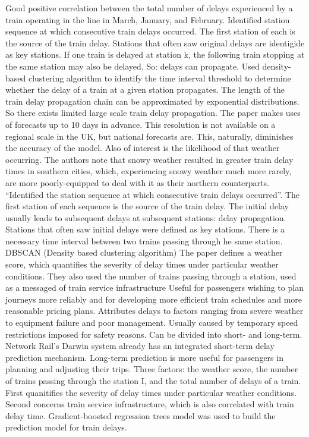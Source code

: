 \documentclass{article}
\begin{document}
Good positive correlation between the total number of delays experienced by a train operating in the line in March, January, and February. 
Identified station sequence at which consecutive train delays occurred. The first station of each is the source of the train delay. Stations that often saw original delays are identigide as key stations. 
If one train is delayed at station k, the following train stopping at the same station may also be delayed. So: delays can propagate. Used density-based clustering algorithm to identify the time interval threshold to determine whether the delay of a train at a given station propagates. 
The length of the train delay propagation chain can be approximated by exponential distributions. So there exists limited large scale train delay propagation. 
The paper makes uses of forecasts up to 10 days in advance. This resolution is not available on a regional scale in the UK, but national forecasts are. This, naturally, diminishes the accuracy of the model.  
Also of interest is the likelihood of that weather occurring. The authors note that snowy weather resulted in greater train delay times in southern cities, which, experiencing snowy weather much more rarely, are more poorly-equipped to deal with it as their northern counterparts.
“Identified the station sequence at which consecutive train delays occurred”. The first station of each sequence is the source of the train delay. The initial delay usually leads to subsequent delays at subsequent stations: delay propagation. Stations that often saw initial delays were defined as key stations. 
There is a necessary time interval between two trains passing through he same station. DBSCAN (Density based clustering algorithm) 
The paper defines a weather score, which quantifies the severity of delay times under particular weather conditions.
They also used the number of trains passing through a station, used as a messaged of train service infrastructure 
Useful for passengers wishing to plan journeys more reliably and for developing more efficient train schedules and more reasonable pricing plans. 
Attributes delays to factors ranging from severe weather to equipment failure and poor management. Usually caused by temporary speed restrictions imposed for safety reasons. 
Can be divided into short- and long-term. Network Rail’s Darwin system already has an integrated short-term delay prediction mechanism.  Long-term prediction is more useful for passengers in planning and adjusting their trips.
Three factors: the weather score, the number of trains passing through the station I, and the total number of delays of a train. First quanitifies the severity of delay times under particular weather conditions. Second concerns train service infrastructure, which is also correlated with train delay time. Gradient-boosted regression trees model was used to build the prediction model for train delays. 
\end{document}
